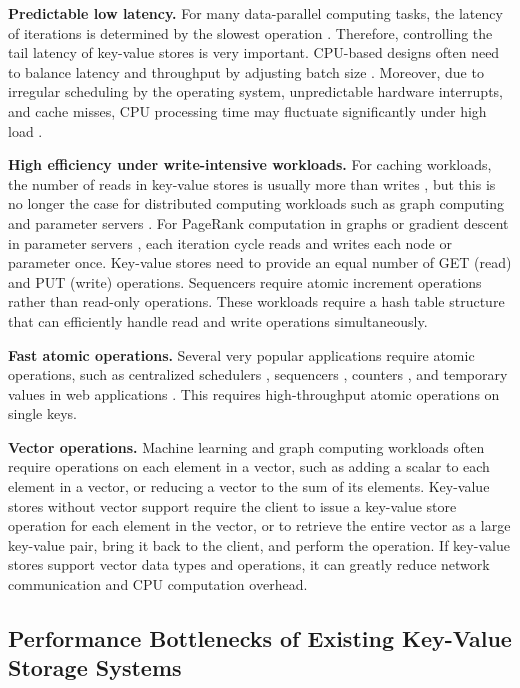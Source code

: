 \textbf{Predictable low latency.} For many data-parallel computing tasks, the latency of iterations is determined by the slowest operation \cite{ousterhout2015ramcloud}. Therefore, controlling the tail latency of key-value stores is very important. CPU-based designs often need to balance latency and throughput by adjusting batch size \cite{li2016full}. Moreover, due to irregular scheduling by the operating system, unpredictable hardware interrupts, and cache misses, CPU processing time may fluctuate significantly under high load \cite{li2016clicknp}.

\textbf{High efficiency under write-intensive workloads.} For caching workloads, the number of reads in key-value stores is usually more than writes \cite{atikoglu2012workload}, but this is no longer the case for distributed computing workloads such as graph computing \cite{page1999pagerank} and parameter servers \cite{li2014scaling}. For PageRank computation in graphs \cite{page1999pagerank} or gradient descent in parameter servers \cite{li2014scaling}, each iteration cycle reads and writes each node or parameter once. Key-value stores need to provide an equal number of GET (read) and PUT (write) operations. Sequencers \cite{kalia2016design} require atomic increment operations rather than read-only operations. These workloads require a hash table structure that can efficiently handle read and write operations simultaneously.

\textbf{Fast atomic operations.} Several very popular applications require atomic operations, such as centralized schedulers \cite{perry2014fastpass}, sequencers \cite{kalia2016design,eris}, counters \cite{zhu2015packet}, and temporary values in web applications \cite{atikoglu2012workload}. This requires high-throughput atomic operations on single keys.

\textbf{Vector operations.} Machine learning and graph computing workloads \cite{li2014scaling,shao2013trinity,xiao17tux2} often require operations on each element in a vector, such as adding a scalar to each element in a vector, or reducing a vector to the sum of its elements. Key-value stores without vector support require the client to issue a key-value store operation for each element in the vector, or to retrieve the entire vector as a large key-value pair, bring it back to the client, and perform the operation. If key-value stores support vector data types and operations, it can greatly reduce network communication and CPU computation overhead.

\subsection{Performance Bottlenecks of Existing Key-Value Storage Systems}
\label{kvdirect:sec:state-of-the-art-kvs}

